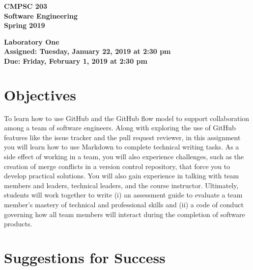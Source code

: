 \documentclass[11pt]{article}
\newcommand{\assignmentduedate}{February 1}
\newcommand{\assignmentassignedate}{January 22}
\newcommand{\assignmentnumber}{One}
\newcommand{\labyear}{2019}
\newcommand{\labdueday}{Friday}
\newcommand{\labassignday}{Tuesday}
\newcommand{\labtime}{2:30 pm}
\newcommand{\assigneddate}{Assigned: \labassignday, \assignmentassignedate, \labyear{} at \labtime{}}
\newcommand{\duedate}{Due: \labdueday, \assignmentduedate, \labyear{} at \labtime{}}
\newcommand{\labtitle}[1]
{
  \begin{center}
    \begin{center}
      \bf
      CMPSC 203\\Software Engineering\\
      Spring 2019\\
      \medskip
    \end{center}
    \bf
    #1
  \end{center}
}
\begin{document}
\thispagestyle{empty}

\labtitle{Laboratory \assignmentnumber{} \\ \assigneddate{} \\ \duedate{}}

\section*{Objectives}

To learn how to use GitHub and the GitHub flow model to support collaboration
among a team of software engineers. Along with exploring the use of GitHub
features like the issue tracker and the pull request reviewer, in this
assignment you will learn how to use Markdown to complete technical writing
tasks. As a side effect of working in a team, you will also experience
challenges, such as the creation of merge conflicts in a version control
repository, that force you to develop practical solutions. You will also gain
experience in talking with team members and leaders, technical leaders, and the
course instructor. Ultimately, students will work together to write (i) an
assessment guide to evaluate a team member's mastery of technical and
professional skills and (ii) a code of conduct governing how all team members
will interact during the completion of software products.

\section*{Suggestions for Success}
\end{document}
